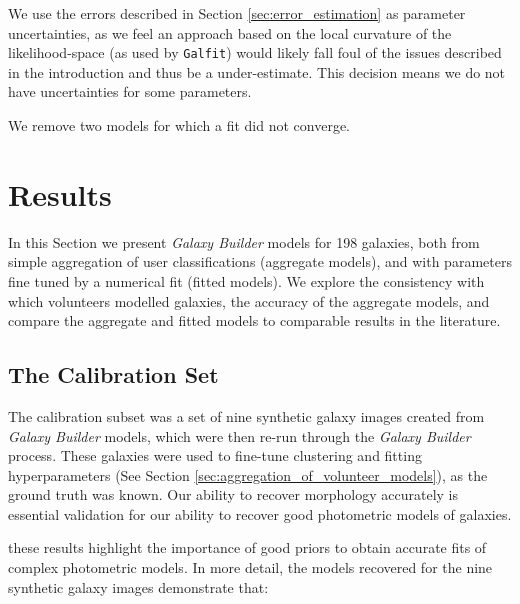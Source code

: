 \documentclass[trackchanges]{aastex63}
\begin{document}
We use the errors described in Section \ref{sec:error_estimation} as parameter uncertainties, as we feel an approach based on the local curvature of the likelihood-space (as used by \texttt{Galfit}) would likely fall foul of the issues described in the introduction and thus be a under-estimate. This decision means we do not have uncertainties for some parameters.

We remove two models for which a fit did not converge.


\section{Results}
\label{sec:results}

In this Section we present \textit{Galaxy Builder} models for 198 galaxies, both from simple aggregation of user classifications (aggregate models), and with parameters fine tuned by a numerical fit (fitted models). We explore the consistency with which volunteers modelled galaxies, the accuracy of the aggregate models, and compare the aggregate and fitted models to comparable results in the literature.

\subsection{The Calibration Set}
\label{sec:calibration-set-results}

The calibration subset was a set of nine synthetic galaxy images created from \textit{Galaxy Builder} models, which were then re-run through the \textit{Galaxy Builder} process. These galaxies were used to fine-tune clustering and fitting hyperparameters (See Section \ref{sec:aggregation_of_volunteer_models}), as the ground truth was known. Our ability to recover morphology accurately is essential validation for our ability to recover good photometric models of galaxies.

 these results highlight the importance of good priors to obtain accurate fits of complex photometric models. In more detail, the models recovered for the nine synthetic galaxy images demonstrate that:
\end{document}
